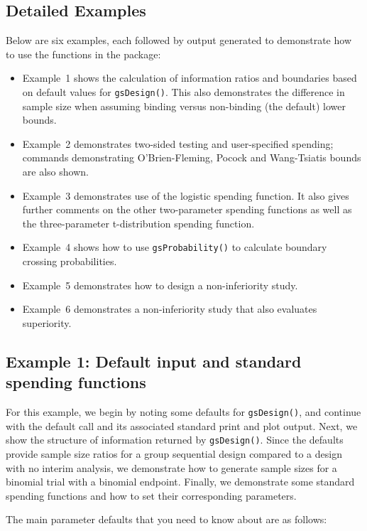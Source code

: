 \subsection{Detailed Examples\label{sec:detailedex}}

Below are six examples, each followed by output generated to demonstrate how
to use the functions in the package: 
\begin{itemize}
\item Example~1 shows the calculation of
information ratios and boundaries based on default values for
\texttt{gsDesign()}. This also demonstrates the difference in sample size when
assuming binding versus non-binding (the default) lower bounds. 
\item Example~2 demonstrates two-sided testing and user-specified spending; 
commands demonstrating O'Brien-Fleming, Pocock and Wang-Tsiatis bounds are also shown.
\item Example~3 demonstrates use of the logistic spending function. It also 
gives further comments on the other two-parameter spending functions as 
well as the three-parameter t-distribution spending function. 
\item Example~4 shows how to use \texttt{gsProbability()} to calculate 
boundary crossing probabilities. 
\item Example~5 demonstrates how to design a non-inferiority study. 
\item Example~6 demonstrates a non-inferiority study that also evaluates 
superiority.
\end{itemize}

\subsection*{Example 1: Default input and standard spending functions}

For this example, we begin by noting some defaults for \texttt{gsDesign()},
and continue with the default call and its associated standard print and plot
output. Next, we show the structure of information returned by
\texttt{gsDesign()}. Since the defaults provide sample size ratios for a group
sequential design compared to a design with no interim analysis, we
demonstrate how to generate sample sizes for a binomial trial with a binomial
endpoint. Finally, we demonstrate some standard spending functions and how to
set their corresponding parameters.

\bigskip

The main parameter defaults that you need to know about are as follows:

